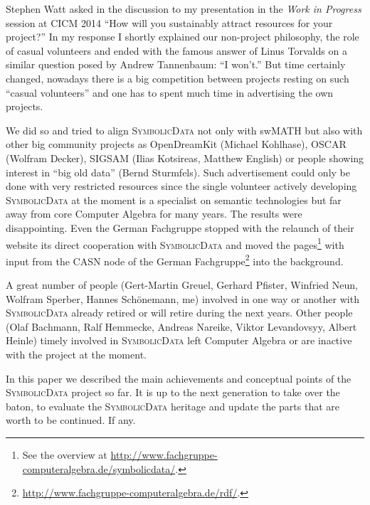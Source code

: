 \documentclass[a4paper,11pt]{article}
\def\SD{\textsc{SymbolicData}}
\begin{document}
Stephen Watt asked in the discussion to my presentation in the \emph{Work in
  Progress} session at CICM 2014 ``How will you sustainably attract resources
for your project?'' In my response I shortly explained our non-project
philosophy, the role of casual volunteers and ended with the famous answer of
Linus Torvalds on a similar question posed by Andrew Tannenbaum: ``I won't.''
But time certainly changed, nowadays there is a big competition between
projects resting on such ``casual volunteers'' and one has to spent much time
in advertising the own projects.

We did so and tried to align {\SD} not only with swMATH but also with other big
community projects as OpenDreamKit (Michael Kohlhase), OSCAR (Wolfram Decker),
SIGSAM (Ilias Kotsireas, Matthew English) or people showing interest in ``big
old data'' (Bernd Sturmfels). Such advertisement could only be done with very
restricted resources since the single volunteer actively developing {\SD} at
the moment is a specialist on semantic technologies but far away from core
Computer Algebra for many years.  The results were disappointing.  Even the
German Fachgruppe stopped with the relaunch of their website its direct
cooperation with {\SD} and moved the pages\footnote{See the overview at
  \url{http://www.fachgruppe-computeralgebra.de/symbolicdata/}.} with input
from the CASN node of the German
Fachgruppe\footnote{\url{http://www.fachgruppe-computeralgebra.de/rdf/}.} into
the background.

A great number of people (Gert-Martin Greuel, Gerhard Pfister, Winfried Neun,
Wolfram Sperber, Hannes Schöne\-mann, me) involved in one way or another with
{\SD} already retired or will retire during the next years.  Other people (Olaf
Bachmann, Ralf Hemmecke, Andreas Nareike, Viktor Levandovsyy, Albert Heinle)
timely involved in {\SD} left Computer Algebra or are inactive with the project
at the moment.

In this paper we described the main achievements and conceptual points of the
{\SD} project so far.  It is up to the next generation to take over the baton,
to evaluate the {\SD} heritage and update the parts that are worth to be
continued. If any.

\end{document}
